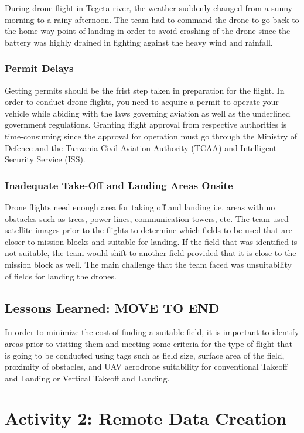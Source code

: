 \documentclass[a4paper,12pt,twoside]{article}
\begin{document}
    During drone flight in Tegeta river, the weather suddenly changed from a sunny morning to a rainy afternoon. The team had to command the drone to go back to the home-way point of landing in order to avoid crashing of the drone since the battery was highly drained in fighting against the heavy wind and rainfall.
    
    \subsubsection{Permit Delays}
     Getting permits should be the frist step taken in preparation for the flight. In order to conduct drone flights, you need to acquire a permit to operate your vehicle while abiding with the laws governing aviation as well as the underlined government regulations.  Granting flight approval from respective authorities is time-consuming since the approval for operation must go through the Ministry of Defence and the Tanzania Civil Aviation Authority (TCAA) and Intelligent Security Service (ISS).
     
     \subsubsection{Inadequate Take-Off and Landing Areas Onsite}
     Drone flights need enough area for taking off and landing i.e. areas with no obstacles such as trees, power lines, communication towers, etc. The team used satellite images prior to the flights to determine which fields to be used that are closer to mission blocks and suitable for landing. If the field that was identified is not suitable, the team would shift to another field provided that it is close to the mission block as well. The main challenge that the team faced was unsuitability of fields for landing the drones.
     
\subsection{Lessons Learned: MOVE TO END}
    In order to minimize the cost of finding a suitable field, it is important to identify areas prior to visiting them and meeting some criteria for the type of flight that is going to be conducted using tags such as field size, surface area of the field, proximity of obstacles, and UAV aerodrone suitability for conventional Takeoff and Landing or Vertical Takeoff and Landing.
    
\section{Activity 2: Remote Data Creation}
\end{document}
